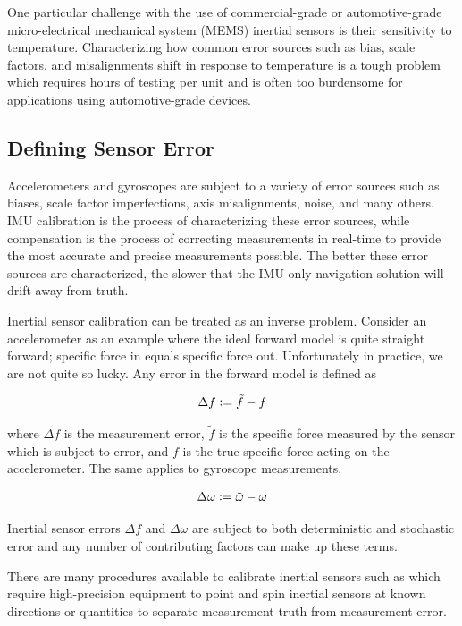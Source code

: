 One particular challenge with the use of commercial-grade or automotive-grade micro-electrical mechanical system (MEMS) inertial sensors is their sensitivity to temperature. Characterizing how common error sources such as bias, scale factors, and misalignments shift in response to temperature is a tough problem which requires hours of testing per unit and is often too burdensome for applications using automotive-grade devices. 

\subsection{Defining Sensor Error}

Accelerometers and gyroscopes are subject to a variety of error sources such as biases, scale factor imperfections, axis misalignments, noise, and many others. IMU calibration is the process of characterizing these error sources, while compensation is the process of correcting measurements in real-time to provide the most accurate and precise measurements possible. The better these error sources are characterized, the slower that the IMU-only navigation solution will drift away from truth. 

Inertial sensor calibration can be treated as an inverse problem. Consider an accelerometer as an example where the ideal forward model is quite straight forward; specific force in equals specific force out. Unfortunately in practice, we are not quite so lucky. Any error in the forward model is defined as

\begin{align*}
	\Delta f \vcentcolon= \tilde{f} - f
\end{align*}

where $\Delta f$ is the measurement error, $\tilde{f}$ is the specific force measured by the sensor which is subject to error, and $f$ is the true specific force acting on the accelerometer. The same applies to gyroscope measurements. 

\begin{align*}
	\Delta \omega \vcentcolon= \tilde{\omega} - \omega
\end{align*}

Inertial sensor errors $\Delta f$ and $\Delta \omega$ are subject to both deterministic and stochastic error and any number of contributing factors can make up these terms.

There are many procedures available to calibrate inertial sensors such as \cite{ImprovedIMUCalibrationProcedures} which require high-precision equipment to point and spin inertial sensors at known directions or quantities to separate measurement truth from measurement error.


